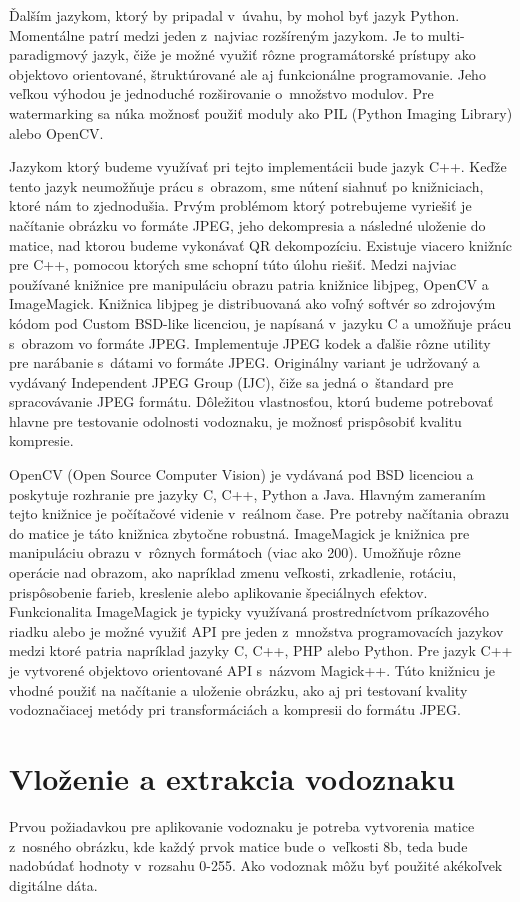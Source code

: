 Ďalším jazykom, ktorý by pripadal v~úvahu, by mohol byť jazyk Python. Momentálne patrí medzi jeden z~najviac rozšíreným jazykom. Je to multi-paradigmový jazyk, čiže je možné využiť rôzne programátorské prístupy ako objektovo orientované, štruktúrované ale aj funkcionálne programovanie. Jeho veľkou výhodou je jednoduché rozširovanie o~množstvo modulov. Pre watermarking sa núka možnosť použiť moduly ako PIL (Python Imaging Library) alebo OpenCV.

Jazykom ktorý budeme využívať pri tejto implementácii bude jazyk C++. Keďže tento jazyk neumožňuje prácu s~obrazom, sme nútení siahnuť po knižniciach, ktoré nám to zjednodušia. Prvým problémom ktorý potrebujeme vyriešiť je načítanie obrázku vo formáte JPEG, jeho dekompresia a následné uloženie do matice, nad ktorou budeme vykonávať QR dekompozíciu. Existuje viacero knižníc pre C++, pomocou ktorých sme schopní túto úlohu riešiť. Medzi najviac používané knižnice pre manipuláciu obrazu patria knižnice libjpeg, OpenCV a ImageMagick.
Knižnica libjpeg je distribuovaná ako voľný softvér so zdrojovým kódom pod Custom BSD-like licenciou, je napísaná v~jazyku C a umožňuje prácu s~obrazom vo formáte JPEG. Implementuje JPEG kodek a ďalšie rôzne utility pre narábanie s~dátami vo formáte JPEG. Originálny variant je udržovaný a vydávaný Independent JPEG Group (IJC), čiže sa jedná o~štandard pre spracovávanie JPEG formátu. Dôležitou vlastnosťou, ktorú budeme potrebovať hlavne pre testovanie odolnosti vodoznaku, je možnosť prispôsobiť kvalitu kompresie.

OpenCV (Open Source Computer Vision) je vydávaná pod BSD licenciou a poskytuje rozhranie pre jazyky C, C++, Python a Java. Hlavným zameraním tejto knižnice je počítačové videnie v~reálnom čase. Pre potreby načítania obrazu do matice je táto knižnica zbytočne robustná.
ImageMagick je knižnica pre manipuláciu obrazu v~rôznych formátoch (viac ako 200). Umožňuje rôzne operácie nad obrazom, ako napríklad zmenu veľkosti, zrkadlenie, rotáciu, prispôsobenie farieb, kreslenie alebo aplikovanie špeciálnych efektov. Funkcionalita ImageMagick je typicky využívaná prostredníctvom príkazového riadku alebo je možné využiť API pre jeden z~množstva programovacích jazykov medzi ktoré patria napríklad jazyky C, C++, PHP alebo Python. Pre jazyk C++ je vytvorené objektovo orientované API s~názvom Magick++. Túto knižnicu je vhodné použiť na načítanie a uloženie obrázku, ako aj pri testovaní kvality vodoznačiacej metódy pri transformáciách a kompresii do formátu JPEG.

\section{Vloženie a extrakcia vodoznaku} \label{vlozenie}
Prvou požiadavkou pre aplikovanie vodoznaku je potreba vytvorenia matice z~nosného obrázku, kde každý prvok matice bude o~veľkosti 8b, teda bude nadobúdať hodnoty v~rozsahu 0-255. Ako vodoznak môžu byť použité akékoľvek digitálne dáta.

